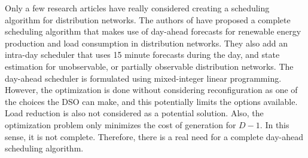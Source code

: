 Only a few research articles have really considered creating a scheduling algorithm for distribution networks. The authors of \cite{Borghetti2010} have proposed a complete scheduling algorithm that makes use of day-ahead forecasts for renewable energy production and load consumption in distribution networks. They also add an intra-day scheduler that uses 15 minute forecasts during the day, and state estimation for unobservable, or partially observable distribution networks. The day-ahead scheduler is formulated using mixed-integer linear programming. However, the optimization is done without considering reconfiguration as one of the choices the DSO can make, and this potentially limits the options available. Load reduction is also not considered as a potential solution. Also, the optimization problem only minimizes the cost of  generation for $D-1$. In this sense, it is not complete. Therefore, there is a real need for a complete day-ahead scheduling algorithm.
